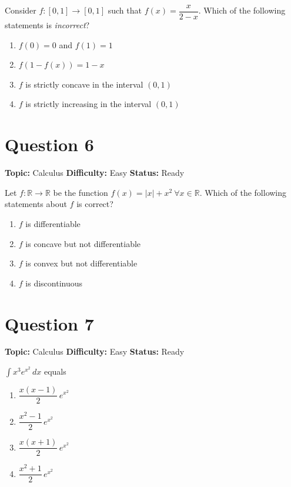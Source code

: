 \documentclass[11pt]{article}
\begin{document}
Consider $f:[0,1]\to[0,1]$ such that $f(x)=\dfrac{x}{2-x}$. Which of the following statements is \emph{incorrect}?
\begin{enumerate}[label=(\Alph*)]
\item $f(0)=0$ and $f(1)=1$
\item $f(1-f(x))=1-x$
\item $f$ is strictly concave in the interval $(0,1)$
\item $f$ is strictly increasing in the interval $(0,1)$
\end{enumerate}

\newpage

\section*{Question 6}


\noindent\textbf{Topic:} Calculus \quad \textbf{Difficulty:} Easy \quad \textbf{Status:} Ready



Let $f:\mathbb{R}\to\mathbb{R}$ be the function $f(x)=|x|+x^{2}\ \forall x\in\mathbb{R}$. Which of the following statements about $f$ is correct?
\begin{enumerate}[label=(\Alph*)]
\item $f$ is differentiable
\item $f$ is concave but not differentiable
\item $f$ is convex but not differentiable
\item $f$ is discontinuous
\end{enumerate}

\newpage

\section*{Question 7}


\noindent\textbf{Topic:} Calculus \quad \textbf{Difficulty:} Easy \quad \textbf{Status:} Ready



$\displaystyle\int x^{3}e^{x^{2}}\,dx$ equals
\begin{enumerate}[label=(\Alph*)]
\item $\dfrac{x(x-1)}{2}\,e^{x^{2}}$
\item $\dfrac{x^{2}-1}{2}\,e^{x^{2}}$
\item $\dfrac{x(x+1)}{2}\,e^{x^{2}}$
\item $\dfrac{x^{2}+1}{2}\,e^{x^{2}}$
\end{enumerate}
\end{document}
